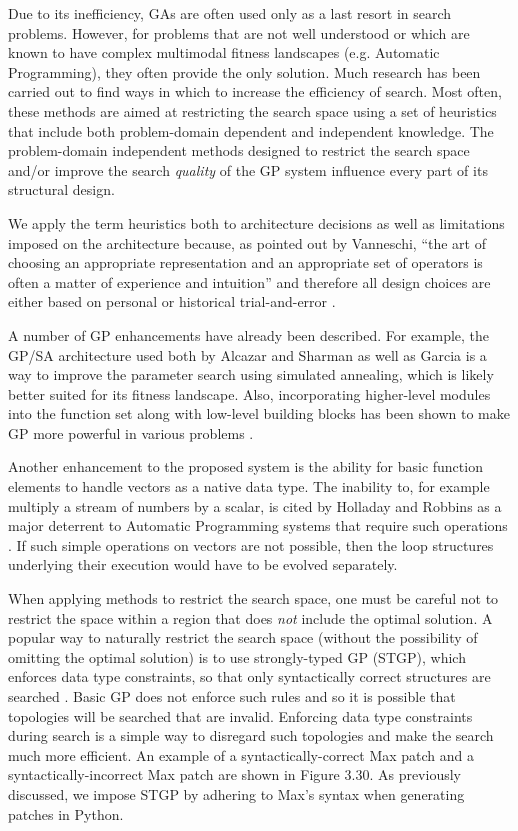 \documentclass[12pt]{report} 	%
\numberwithin{figure}{chapter}
\numberwithin{table}{chapter}
\numberwithin{equation}{chapter}
\begin{document}
\begin{flushleft}
Due to its inefficiency, GAs are often used only as a last resort in search problems. However, for problems that are not well understood or which are known to have complex multimodal fitness landscapes (e.g. Automatic Programming), they often provide the only solution. Much research has been carried out to find ways in which to increase the efficiency of search. Most often, these methods are aimed at restricting the search space using a set of heuristics that include both problem-domain dependent and independent knowledge. The problem-domain independent methods designed to restrict the search space and/or improve the search \textit{quality} of the GP system influence every part of its structural design. 

We apply the term heuristics both to architecture decisions as well as limitations imposed on the architecture because, as pointed out by Vanneschi, ``the art of choosing an appropriate representation and an appropriate set of operators is often a matter of experience and intuition'' and therefore all design choices are either based on personal or historical trial-and-error \cite[p. 6]{Vanneschi:2004le}.

A number of GP enhancements have already been described. For example, the GP/SA architecture used both by Alcazar and Sharman \cite{Alcazar:1996la} as well as Garcia \cite{Garcia:2002cq} is a way to improve the parameter search using simulated annealing, which is likely better suited for its fitness landscape. Also, incorporating higher-level modules into the function set along with low-level building blocks has been shown to make GP more powerful in various problems \cite{Koza:1997zr}. 

Another enhancement to the proposed system is the ability for basic function elements to handle vectors as a native data type. The inability to, for example multiply a stream of numbers by a scalar, is cited by Holladay and Robbins as a major deterrent to Automatic Programming systems that require such operations \cite[p. 1]{Holladay:2007ct}. If such simple operations on vectors are not possible, then the loop structures underlying their execution would have to be evolved separately.

When applying methods to restrict the search space, one must be careful not to restrict the space within a region that does \textit{not} include the optimal solution. A popular way to naturally restrict the search space (without the possibility of omitting the optimal solution) is to use strongly-typed GP (STGP), which enforces data type constraints, so that only syntactically correct structures are searched  \cite{Vanneschi:2004le, Harris:1997qf, Pachet:2007if}. Basic GP does not enforce such rules and so it is possible that topologies will be searched that are invalid. Enforcing data type constraints during search is a simple way to disregard such topologies and make the search much more efficient. An example of a syntactically-correct Max patch and a syntactically-incorrect Max patch are shown in Figure 3.30. As previously discussed, we impose STGP by adhering to Max's syntax when generating patches in Python.


\end{flushleft}
\end{document}
